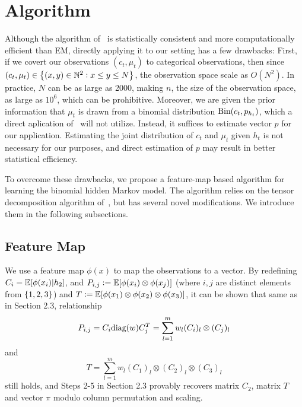 \section{Algorithm}
Although the algorithm of~\cite{AGHKT12} is statistically consistent and more computationally efficient than EM, directly applying it to our setting has a few drawbacks: First, if we covert our observations $(c_t, \mu_t)$ to categorical observations, then since $(c_t, \mu_t) \in \cbr{(x,y) \in \N^2: x\leq y \leq N}$, the observation space scale as $O(N^2)$.  In practice, $N$ can be as large as 2000, making $n$, the size of the observation space, as large as $10^6$, which can be prohibitive. Moreover, we are given the prior information that $\mu_t$ is drawn from a binomial distribution $\text{Bin}(c_t, p_{h_t})$, which a direct aplication of~\cite{AGHKT12} will not utilize. Instead, it suffices to estimate vector $p$ for our application. Estimating the joint distribution of $c_t$ and $\mu_t$ given $h_t$ is not necessary for our purposes, and direct estimation of $p$ may result in better statistical efficiency.

To overcome these drawbacks, we propose a feature-map based algorithm for learning the binomial hidden Markov model. The algorithm relies on the tensor decomposition algorithm of~\cite{AGHKT12}, but has several novel modifications. We introduce them in the following subsections.

\subsection{Feature Map} We use a feature map
$\phi(x)$ to map the observations to a vector. By redefining $C_i = \mathbb{E}[\phi(x_i)|h_2]$,
and $P_{i,j} := \mathbb{E}[\phi(x_i) \otimes \phi(x_j)]$ (where $i,j$ are distinct elements from $\cbr{1,2,3}$)
and $T := \mathbb{E}[\phi(x_1) \otimes \phi(x_2) \otimes \phi(x_3)]$, it can be shown that same as in Section 2.3, relationship
\[ P_{i,j} = C_i \text{diag}(w) C_j^T = \sum_{l=1}^m w_l (C_i)_l \otimes (C_j)_l \]
and
\[ T = \sum_{l=1}^m w_l (C_1)_l \otimes (C_2)_l \otimes (C_3)_l \]
still holds, and Steps 2-5 in Section 2.3 provably recovers matrix $C_2$, matrix $T$ and vector $\pi$
modulo column permutation and scaling.


